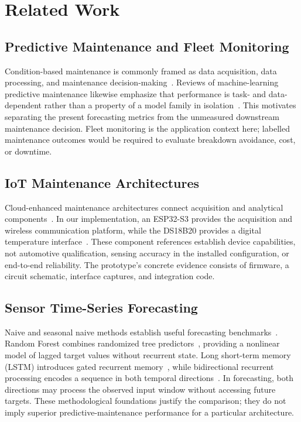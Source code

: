 \documentclass[conference]{IEEEtran}
\begin{document}
\section{Related Work}
\subsection{Predictive Maintenance and Fleet Monitoring}
Condition-based maintenance is commonly framed as data acquisition, data
processing, and maintenance decision-making~\cite{jardine2006}. Reviews of
machine-learning predictive maintenance likewise emphasize that performance is
task- and data-dependent rather than a property of a model family in
isolation~\cite{carvalho2019,zhu2024}. This motivates separating the present
forecasting metrics from the unmeasured downstream maintenance decision. Fleet
monitoring is the application context here; labelled maintenance outcomes would
be required to evaluate breakdown avoidance, cost, or downtime.

\subsection{IoT Maintenance Architectures}
Cloud-enhanced maintenance architectures connect acquisition and analytical components~\cite{zhu2024}. In our implementation, an ESP32-S3 provides the acquisition and wireless communication platform, while the DS18B20 provides a digital temperature interface~\cite{esp32,ds18b20}. These component references establish device capabilities, not automotive qualification, sensing accuracy in the installed configuration, or end-to-end reliability. The prototype's concrete evidence consists of firmware, a circuit schematic, interface captures, and integration code.

\subsection{Sensor Time-Series Forecasting}
Naive and seasonal naive methods establish useful forecasting benchmarks~\cite{hyndman2021}. Random Forest combines randomized tree predictors~\cite{breiman2001}, providing a nonlinear model of lagged target values without recurrent state. Long short-term memory (LSTM) introduces gated recurrent memory~\cite{hochreiter1997}, while bidirectional recurrent processing encodes a sequence in both temporal directions~\cite{schuster1997}. In forecasting, both directions may process the observed input window without accessing future targets. These methodological foundations justify the comparison; they do not imply superior predictive-maintenance performance for a particular architecture.
\end{document}
